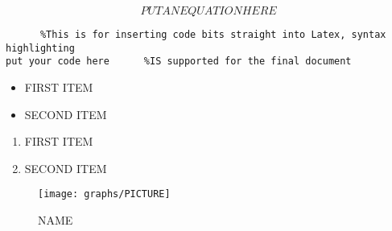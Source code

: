 \begin{equation}
\label{SECTION:eq:EQUATION NAME}
	PUT AN EQUATION HERE
\end{equation}

\begin{lstlisting}		%This is for inserting code bits straight into Latex, syntax highlighting
put your code here		%IS supported for the final document
\end{lstlisting}



\begin{itemize}
	\item FIRST ITEM
	\item SECOND ITEM
\end{itemize}



\begin{enumerate}
	\item FIRST ITEM
	\item SECOND ITEM
\end{enumerate}


\begin{figure}[ht]
	\centering
		\texttt{[image: graphs/PICTURE]}
					
	\caption{NAME}
	\label{SECTION:fig:NAME}
\end{figure}


